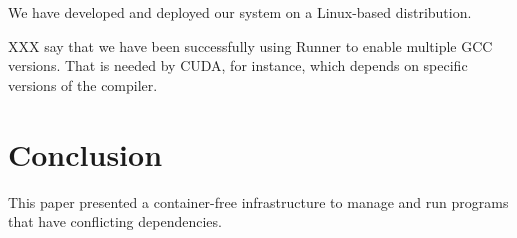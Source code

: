\documentclass[sigplan, anonymous, 10pt]{acmart}
\begin{document}
We have developed and deployed our system on a Linux-based distribution.

XXX say that we have been successfully using Runner to enable multiple GCC versions.
That is needed by CUDA, for instance, which depends on specific versions of the compiler.

\lipsum[9-13]

\section{Conclusion}
This paper presented a container-free infrastructure to manage and run programs that have
conflicting dependencies. 

\lipsum[14-16]



\end{document}

